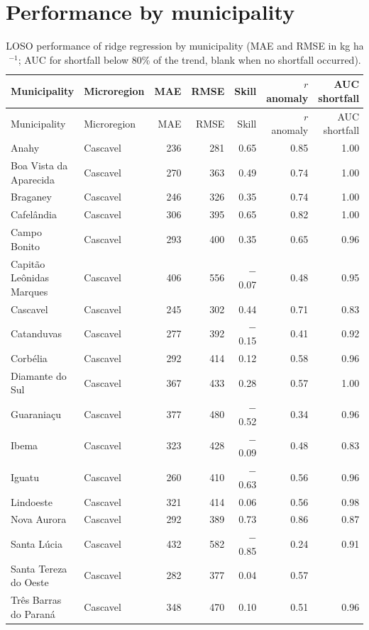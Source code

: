\section{Performance by municipality}

\begingroup\footnotesize
\begin{longtable}{@{}llrrrrr@{}}
\caption{LOSO performance of ridge regression by municipality (MAE and RMSE in kg ha$^{-1}$; AUC for shortfall below 80\% of the trend, blank when no shortfall occurred).}\label{tab:S_mun}\\
\toprule
Municipality & Microregion & MAE & RMSE & Skill & $r$ anomaly & AUC shortfall \\
\midrule
\endfirsthead
\toprule
Municipality & Microregion & MAE & RMSE & Skill & $r$ anomaly & AUC shortfall \\
\midrule
\endhead
Anahy & Cascavel & 236 & 281 & 0.65 & 0.85 & 1.00 \\
Boa Vista da Aparecida & Cascavel & 270 & 363 & 0.49 & 0.74 & 1.00 \\
Braganey & Cascavel & 246 & 326 & 0.35 & 0.74 & 1.00 \\
Cafelândia & Cascavel & 306 & 395 & 0.65 & 0.82 & 1.00 \\
Campo Bonito & Cascavel & 293 & 400 & 0.35 & 0.65 & 0.96 \\
Capitão Leônidas Marques & Cascavel & 406 & 556 & $-$0.07 & 0.48 & 0.95 \\
Cascavel & Cascavel & 245 & 302 & 0.44 & 0.71 & 0.83 \\
Catanduvas & Cascavel & 277 & 392 & $-$0.15 & 0.41 & 0.92 \\
Corbélia & Cascavel & 292 & 414 & 0.12 & 0.58 & 0.96 \\
Diamante do Sul & Cascavel & 367 & 433 & 0.28 & 0.57 & 1.00 \\
Guaraniaçu & Cascavel & 377 & 480 & $-$0.52 & 0.34 & 0.96 \\
Ibema & Cascavel & 323 & 428 & $-$0.09 & 0.48 & 0.83 \\
Iguatu & Cascavel & 260 & 410 & $-$0.63 & 0.56 & 0.96 \\
Lindoeste & Cascavel & 321 & 414 & 0.06 & 0.56 & 0.98 \\
Nova Aurora & Cascavel & 292 & 389 & 0.73 & 0.86 & 0.87 \\
Santa Lúcia & Cascavel & 432 & 582 & $-$0.85 & 0.24 & 0.91 \\
Santa Tereza do Oeste & Cascavel & 282 & 377 & 0.04 & 0.57 &  \\
Três Barras do Paraná & Cascavel & 348 & 470 & 0.10 & 0.51 & 0.96 \\

\end{longtable}
